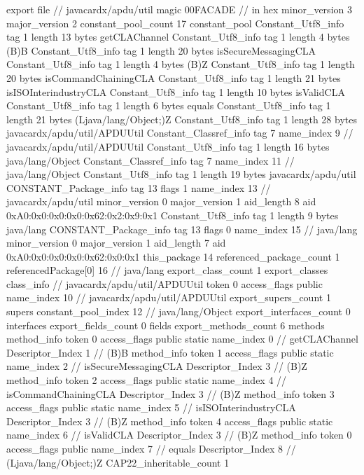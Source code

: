 export file {		// javacardx/apdu/util
	magic	00FACADE		 // in hex
	minor_version	3
	major_version	2
	constant_pool_count	17
	constant_pool {
		Constant_Utf8_info {
			tag	1
			length	13
			bytes	getCLAChannel
		}
		Constant_Utf8_info {
			tag	1
			length	4
			bytes	(B)B
		}
		Constant_Utf8_info {
			tag	1
			length	20
			bytes	isSecureMessagingCLA
		}
		Constant_Utf8_info {
			tag	1
			length	4
			bytes	(B)Z
		}
		Constant_Utf8_info {
			tag	1
			length	20
			bytes	isCommandChainingCLA
		}
		Constant_Utf8_info {
			tag	1
			length	21
			bytes	isISOInterindustryCLA
		}
		Constant_Utf8_info {
			tag	1
			length	10
			bytes	isValidCLA
		}
		Constant_Utf8_info {
			tag	1
			length	6
			bytes	equals
		}
		Constant_Utf8_info {
			tag	1
			length	21
			bytes	(Ljava/lang/Object;)Z
		}
		Constant_Utf8_info {
			tag	1
			length	28
			bytes	javacardx/apdu/util/APDUUtil
		}
		Constant_Classref_info {
			tag	7
			name_index	9		// javacardx/apdu/util/APDUUtil
		}
		Constant_Utf8_info {
			tag	1
			length	16
			bytes	java/lang/Object
		}
		Constant_Classref_info {
			tag	7
			name_index	11		// java/lang/Object
		}
		Constant_Utf8_info {
			tag	1
			length	19
			bytes	javacardx/apdu/util
		}
		CONSTANT_Package_info {
			tag	13
			flags	1
			name_index	13		// javacardx/apdu/util
			minor_version	0
			major_version	1
			aid_length	8
			aid	0xA0:0x0:0x0:0x0:0x62:0x2:0x9:0x1
		}
		Constant_Utf8_info {
			tag	1
			length	9
			bytes	java/lang
		}
		CONSTANT_Package_info {
			tag	13
			flags	0
			name_index	15		// java/lang
			minor_version	0
			major_version	1
			aid_length	7
			aid	0xA0:0x0:0x0:0x0:0x62:0x0:0x1
		}
	}
	this_package	14
	referenced_package_count	1
	referencedPackage[0]	16		// java/lang
	export_class_count	1
	export_classes {
		class_info {		// javacardx/apdu/util/APDUUtil
			token	0
			access_flags	public
			name_index	10		// javacardx/apdu/util/APDUUtil
			export_supers_count	1
			supers {
				constant_pool_index	12		// java/lang/Object
			}
			export_interfaces_count	0
			interfaces {
			}
			export_fields_count	0
			fields {
			}
			export_methods_count	6
			methods {
				method_info {
					token	0
					access_flags	public static
					name_index	0		// getCLAChannel
					Descriptor_Index	1		// (B)B
				}
				method_info {
					token	1
					access_flags	public static
					name_index	2		// isSecureMessagingCLA
					Descriptor_Index	3		// (B)Z
				}
				method_info {
					token	2
					access_flags	public static
					name_index	4		// isCommandChainingCLA
					Descriptor_Index	3		// (B)Z
				}
				method_info {
					token	3
					access_flags	public static
					name_index	5		// isISOInterindustryCLA
					Descriptor_Index	3		// (B)Z
				}
				method_info {
					token	4
					access_flags	public static
					name_index	6		// isValidCLA
					Descriptor_Index	3		// (B)Z
				}
				method_info {
					token	0
					access_flags	public
					name_index	7		// equals
					Descriptor_Index	8		// (Ljava/lang/Object;)Z
				}
			}
			CAP22_inheritable_count	1
		}
	}
}
